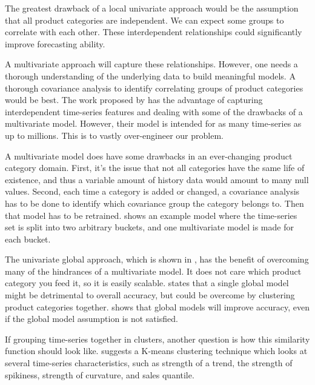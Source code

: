 The greatest drawback of a local univariate approach would be the assumption that all product categories
are independent. We can expect some groups to correlate with each other. These interdependent relationships
could significantly improve forecasting ability.

A multivariate approach will capture these relationships.
However, one needs a thorough understanding of the underlying data to build meaningful models.
A thorough covariance analysis to identify correlating groups of product categories would be best.
The work proposed by \cite{Sen2019} has the advantage of capturing interdependent time-series features and dealing with
some of the drawbacks of a multivariate model. However, their model is intended for as many time-series as up to millions.
This is to vastly over-engineer our problem.

A multivariate model does have some drawbacks in an ever-changing product category domain.
First, it's the issue that not all categories have the same life of existence, and thus a variable
amount of history data would amount to many null values.
Second, each time a category is added or changed, a covariance analysis has to be done to identify
which covariance group the category belongs to. Then that model has to be retrained.
 shows an example model where the time-series set is split into two arbitrary buckets,
and one multivariate model is made for each bucket.

The univariate global approach, which is shown in , has the benefit of overcoming many of the hindrances of a multivariate model.
It does not care which product category you feed it, so it is easily scalable. \cite{Bandara2017}
states that a single global model might be detrimental to overall accuracy, but could be overcome by clustering product categories together.
\cite{Rabanser2020}
shows that global models will improve accuracy, even if the global model assumption is not satisfied.

If grouping time-series together in clusters, another question is how this similarity function should look like.
\cite{Bandara2017} suggests a K-means clustering technique
which looks at several time-series characteristics, such as
strength of a trend, the strength of spikiness, strength of curvature,
and sales quantile.


